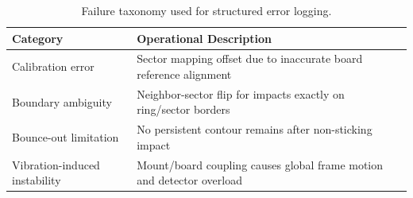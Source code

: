 \begin{table}[H]
	\centering
	\begin{tabularx}{\linewidth}{@{}X X@{}}
		\toprule
		\textbf{Category} & \textbf{Operational Description} \\
		\midrule
		Calibration error & Sector mapping offset due to inaccurate board reference alignment \\
		Boundary ambiguity & Neighbor-sector flip for impacts exactly on ring/sector borders \\
		Bounce-out limitation & No persistent contour remains after non-sticking impact \\
		Vibration-induced instability & Mount/board coupling causes global frame motion and detector overload \\
		\bottomrule
	\end{tabularx}
\caption{Failure taxonomy used for structured error logging.}
\label{tab:failure_taxonomy}
\end{table}